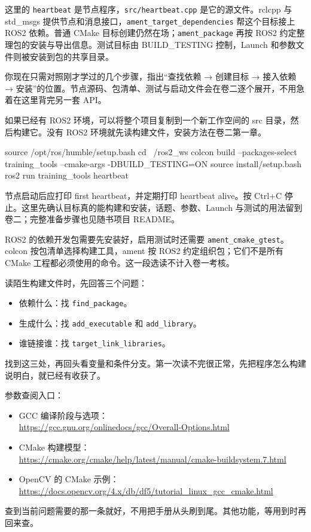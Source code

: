这里的 \texttt{heartbeat} 是节点程序，\texttt{src/heartbeat.cpp} 是它的源文件。rclcpp 与 std\_msgs 提供节点和消息接口，\texttt{ament\_target\_dependencies} 帮这个目标接上 ROS2 依赖。普通 CMake 目标创建仍然在场；\texttt{ament\_package} 再按 ROS2 约定整理包的安装与导出信息。测试目标由 BUILD\_TESTING 控制，Launch 和参数文件则被安装到包的共享目录。

你现在只需对照刚才学过的几个步骤，指出“查找依赖 → 创建目标 → 接入依赖 → 安装”的位置。节点源码、包清单、测试与启动文件会在卷二逐个展开，不用急着在这里背完另一套 API。

如果已经有 ROS2 环境，可以将整个项目复制到一个新工作空间的 src 目录，然后构建它。没有 ROS2 环境就先读构建文件，安装方法在卷二第一章。
\begin{tbash}
source /opt/ros/humble/setup.bash
cd ~/ros2_ws
colcon build --packages-select training_tools --cmake-args -DBUILD_TESTING=ON
source install/setup.bash
ros2 run training_tools heartbeat
\end{tbash}
节点启动后应打印 first heartbeat，并定期打印 heartbeat alive。按 Ctrl+C 停止。这里先确认目标真的能构建和安装，话题、参数、Launch 与测试的用法留到卷二；完整准备步骤也见随书项目 README。

\begin{note}
ROS2 的依赖开发包需要先安装好，启用测试时还需要 \texttt{ament\_cmake\_gtest}。colcon 按包清单选择构建工具，ament 按 ROS2 约定组织包；它们不是所有 CMake 工程都必须使用的命令。这一段选读不计入卷一考核。
\end{note}

\begin{conclusion}
读陌生构建文件时，先回答三个问题：
\begin{itemize}
    \item 依赖什么：找 \texttt{find\_package}。
    \item 生成什么：找 \texttt{add\_executable} 和 \texttt{add\_library}。
    \item 谁链接谁：找 \texttt{target\_link\_libraries}。
\end{itemize}
找到这三处，再回头看变量和条件分支。第一次读不完很正常，先把程序怎么构建说明白，就已经有收获了。
\end{conclusion}

\begin{note}
参数查阅入口：
\begin{itemize}
    \item GCC 编译阶段与选项：\\
    \url{https://gcc.gnu.org/onlinedocs/gcc/Overall-Options.html}
    \item CMake 构建模型：\\
    \url{https://cmake.org/cmake/help/latest/manual/cmake-buildsystem.7.html}
    \item OpenCV 的 CMake 示例：\\
    \url{https://docs.opencv.org/4.x/db/df5/tutorial_linux_gcc_cmake.html}
\end{itemize}
查到当前问题需要的那一条就好，不用把手册从头刷到尾。其他功能，等用到时再回来查。
\end{note}

